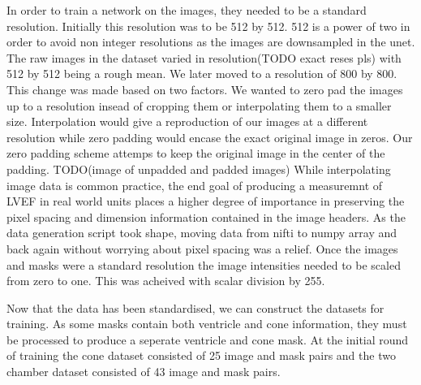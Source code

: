 \documentclass{article}
\begin{document}
\par{}
In order to train a network on the images, they needed to be a standard resolution.
Initially this resolution was to be 512 by 512. 512 is a power of two in order to avoid non integer resolutions as the images are downsampled in the unet.
The raw images in the dataset varied in resolution(TODO exact reses pls) with 512 by 512 being a rough mean.
We later moved to a resolution of 800 by 800. This change was made based on two factors. 
We wanted to zero pad the images up to a resolution insead of cropping them or interpolating them to a smaller size.
Interpolation would give a reproduction of our images at a different resolution  while zero padding would encase the exact original image in zeros.
Our zero padding scheme attemps to keep the original image in the center of the padding.
TODO(image of unpadded and padded images)
While interpolating image data is common practice, the end goal of producing a measuremnt of LVEF in real world units places a higher degree of importance in preserving the pixel spacing and dimension information contained in the image headers.
As the data generation script took shape, moving data from nifti to numpy array and back again without worrying about pixel spacing was a relief.
Once the images and masks were a standard resolution the image intensities needed to be scaled from zero to one. This was acheived with scalar division by 255.
\par{}
Now that the data has been standardised, we can construct the datasets for training.
As some masks contain both ventricle and cone information, they must be processed to produce a seperate ventricle and cone mask.
At the initial round of training the cone dataset consisted of 25 image and mask pairs and the two chamber dataset consisted of 43 image and mask pairs.
\end{document}
